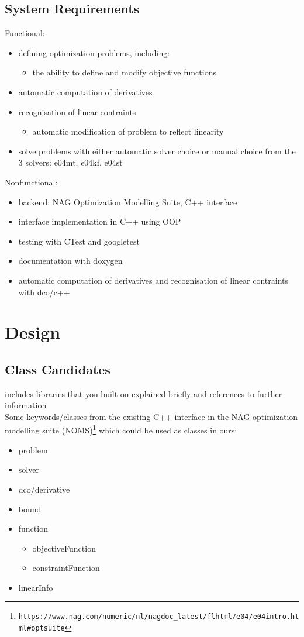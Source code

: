 \documentclass{book}
\begin{document}
\section{System Requirements}
Functional:
\begin{itemize}
\item defining optimization problems, including:
	\begin{itemize}
	\item the ability to define and modify objective functions
	\end{itemize}
\item automatic computation of derivatives
\item recognisation of linear contraints
	\begin{itemize}
	\item automatic modification of problem to reflect linearity
	\end{itemize}
\item solve problems with either automatic solver choice or manual choice from the 3 solvers: e04mt, e04kf, e04st
\end{itemize}
Nonfunctional:
\begin{itemize}
\item backend: NAG Optimization Modelling Suite, C++ interface
\item interface implementation in C++ using OOP
\item testing with CTest and googletest
\item documentation with doxygen
\item automatic computation of derivatives and recognisation of linear contraints with dco/c++
\end{itemize}

\chapter{Design} \label{ch:design}

\section{Class Candidates}
includes libraries that you built on explained briefly and references to further information\\
Some keywords/classes from the existing C++ interface in the NAG optimization modelling suite (NOMS)\footnote{\tt https://www.nag.com/numeric/nl/nagdoc\_latest/flhtml/e04/e04intro.html\#optsuite} which could be used as classes in ours:
\begin{itemize}
	\item problem
	\item solver
	\item dco/derivative
	\item bound
	\item function
		\begin{itemize}
			\item objectiveFunction
			\item constraintFunction
		\end{itemize}
	\item linearInfo
\end{itemize}
\end{document}
